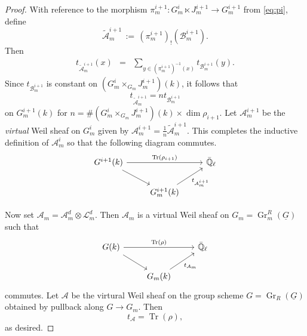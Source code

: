 \documentclass[10pt]{amsart}
\theoremstyle{plain}
\theoremstyle{definition}
\newcommand{\EE}{\mathbb{\bar Q}_\ell}
\newcommand{\Fq}{k}
\DeclareMathOperator{\Gr}{Gr}
\DeclareMathOperator{\trace}{Tr}
\newcommand{\ceq}{{\, :=\, }}
\newcommand{\trFrob}[1]{t_{#1}}
\newcommand{\cs}[1]{{\mathcal{#1}}}
\begin{document}
\begin{proof}
With reference to the morphism $\pi_m^{i+1} : G_m^i \ltimes J_m^{i+1} \to G_m^{i+1}$ from \eqref{eq:pi}, define 
\[
\cs{\tilde A}_m^{i+1} \ceq (\pi_m^{i+1})_! (\cs{B}_m^{i+1}).
\]
Then
\begin{eqnarray*}
\trFrob{\cs{\tilde A}^{i+1}_m}(x)
&=& \sum_{y\in (\pi_m^{i+1})^{-1}(x)}  \trFrob{\cs{B}_m^{i+1}}(y).
\end{eqnarray*}
Since $\trFrob{\cs{B}^{i+1}_m}$ is constant on $(G_m^{i}\times_{G_m} J_m^{i+1})(\Fq)$, it follows that 
\[
\trFrob{\cs{\tilde A}^{i+1}_m} = n \trFrob{\cs{B}^{i+1}_m}
\]
on $G_m^{i+1}(\Fq)$ for $n = \# (G_m^{i}\times_{G_m} J_m^{i+1})(\Fq) \times \dim \rho_{i+1} $.
Let $\cs{A}_m^{i+1}$ be the \emph{virtual} Weil sheaf on $G_m^i$ given by $\cs{A}_m^{i+1} = \frac{1}{n} \cs{\tilde A}_m^{i+1}$. 
%
This completes the inductive definition of $\cs{A}_m^i$ so that the following diagram commutes.
\[
\begin{tikzcd}
G^{i+1}(\Fq) \arrow{rr}{\trace(\rho_{i+1})} \arrow{rd} && \EE\\
& G_m^{i+1}(\Fq)\arrow{ru}[swap]{{\trFrob{\cs{A}_m^{i+1}}} } & 
\end{tikzcd}
\]

Now set $\cs{A}_m = \cs{A}_m^{d} \otimes \cs{L}_m^d$.
Then $\cs{A}_m$ is a virtual Weil sheaf on $G_m = \Gr^{R}_m(\underline{G})$ such that
\[
\begin{tikzcd}
G(\Fq) \arrow{rr}{\trace(\rho)} \arrow{rd} && \EE\\
& G_m(\Fq) \arrow{ru}[swap]{\trFrob{\cs{A}_m}} & 
\end{tikzcd}
\]
commutes.
Let $\cs{A}$ be the virtural Weil sheaf on the group scheme $G= \Gr_{R}(\underline{G})$ obtained by pullback along $G \to G_m$.
Then 
\[
\trFrob{\cs{A}} = \trace(\rho),
\] 
as desired.
\end{proof}

%
\end{document}
